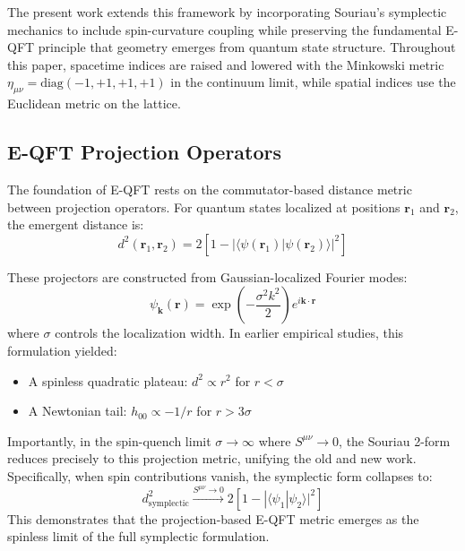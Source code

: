 \documentclass[prd,twocolumn,showpacs,superscriptaddress]{revtex4-2}
\begin{document}
	The present work extends this framework by incorporating Souriau's symplectic mechanics to include spin-curvature coupling while preserving the fundamental E-QFT principle that geometry emerges from quantum state structure. Throughout this paper, spacetime indices are raised and lowered with the Minkowski metric $\eta_{\mu\nu} = \text{diag}(-1, +1, +1, +1)$ in the continuum limit, while spatial indices use the Euclidean metric on the lattice.
	
	\subsection{E-QFT Projection Operators}
	
	The foundation of E-QFT rests on the commutator-based distance metric between projection operators. For quantum states localized at positions $\bm{r}_1$ and $\bm{r}_2$, the emergent distance is:
	\begin{equation}
		d^2(\bm{r}_1, \bm{r}_2) = 2\left[1 - |\langle\psi(\bm{r}_1)|\psi(\bm{r}_2)\rangle|^2\right]
		\label{eq:eqft_distance}
	\end{equation}
	
	These projectors are constructed from Gaussian-localized Fourier modes:
	\begin{equation}
		\psi_{\bm{k}}(\bm{r}) = \exp\left(-\frac{\sigma^2 k^2}{2}\right) e^{i\bm{k} \cdot \bm{r}}
		\label{eq:gaussian_modes}
	\end{equation}
	where $\sigma$ controls the localization width. In earlier empirical studies, this formulation yielded:
	\begin{itemize}
		\item A spinless quadratic plateau: $d^2 \propto r^2$ for $r < \sigma$
		\item A Newtonian tail: $h_{00} \propto -1/r$ for $r > 3\sigma$
	\end{itemize}
	
	Importantly, in the spin-quench limit $\sigma \to \infty$ where $S^{\mu\nu} \to 0$, the Souriau 2-form reduces precisely to this projection metric, unifying the old and new work. Specifically, when spin contributions vanish, the symplectic form collapses to:
	\begin{equation}
		d^2_{\text{symplectic}} \xrightarrow{S^{\mu\nu} \to 0} 2\left[1 - |\langle\psi_1|\psi_2\rangle|^2\right]
		\label{eq:spin_quench_limit}
	\end{equation}
	This demonstrates that the projection-based E-QFT metric emerges as the spinless limit of the full symplectic formulation.
	
\end{document}
